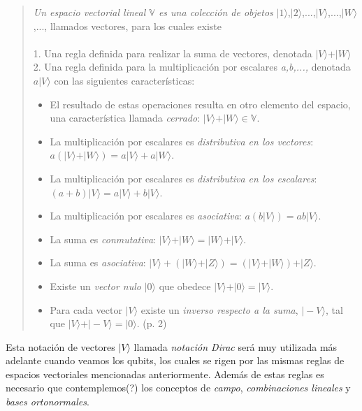 \documentclass[11pt,a4paper]{article}
\begin{document}
\begin{quote}
\textit{Un espacio vectorial lineal $\mathbb{V}$ es una colección de objetos} $\vert1\rangle$,$\vert2\rangle$,...,$\vert V\rangle$,...,$\vert W\rangle$,..., llamados vectores, para los cuales existe
\\\\
1. Una regla definida para realizar la suma de vectores, denotada $\vert V\rangle+\vert W\rangle$
\\2. Una regla definida para la multiplicación por escalares \textit{a,b,...,} denotada $a\vert V\rangle$ con las siguientes características:
\\
\begin{itemize}
\item El resultado de estas operaciones resulta en otro elemento del espacio, una característica llamada \textit{cerrado}: $\vert V\rangle+ \vert W\rangle\in\mathbb{V}$.
\item La multiplicación por escalares es \textit{distributiva en los vectores}: $a(\vert V\rangle+\vert W\rangle)=a\vert V\rangle+a\vert W\rangle$.
\item La multiplicación por escalares es \textit{distributiva en los escalares}: $(a+b)\vert V\rangle=a\vert V\rangle+b\vert V\rangle$.
\item La multiplicación por escalares es \textit{asociativa}: $a(b\vert V\rangle)=ab\vert V\rangle$.
\item La suma es \textit{conmutativa}: $\vert V\rangle+\vert W\rangle=\vert W\rangle+\vert V\rangle$.
\item La suma es \textit{asociativa}: $\vert V\rangle+(\vert W\rangle+\vert Z\rangle)=(\vert V\rangle+\vert W\rangle)+\vert Z\rangle$.
\item Existe un \textit{vector nulo} $\vert 0\rangle$ que obedece $\vert V\rangle+\vert 0\rangle=\vert V\rangle$.
\item Para cada vector $\vert V\rangle$ existe un \textit{inverso respecto a la suma}, $\vert -V\rangle$, tal que $\vert V\rangle+\vert -V\rangle=\vert 0\rangle$. (p. 2)
\end{itemize}
\end{quote}

Esta notación de vectores $\vert V\rangle$ llamada \textit{notación Dirac} será muy utilizada más adelante cuando veamos los qubits, los cuales se rigen por las mismas reglas de espacios vectoriales mencionadas anteriormente. Además de estas reglas es necesario que contemplemos(?) los conceptos de \textit{campo}, \textit{combinaciones lineales} y \textit{bases ortonormales}.
\end{document}
